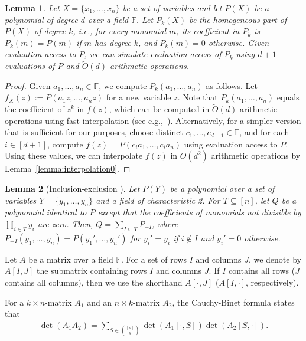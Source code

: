 \documentclass[10pt,a4paper]{article}
\newtheorem{lemma}{Lemma}[section]
\newcommand{\F}{\ensuremath{\mathbb F}\xspace}
\begin{document}
\begin{lemma} \label{lemma:interpolation}
  Let $X = \{ x_1, \dots, x_n \}$ be a set of variables and let $P(X)$ be a polynomial of degree $d$ over a field $\F$.
  Let $P_k(X)$ be the homogeneous part of $P(X)$ of degree $k$, i.e., for every monomial $m$, its coefficient in $P_k$ is $P_k(m) = P(m)$ if $m$ has degree $k$, and $P_k(m) = 0$ otherwise. 
  Given evaluation access to $P$, we can simulate evaluation access of $P_k$ using $d + 1$ evaluations of $P$ and $\tilde{O}(d)$ arithmetic operations.
\end{lemma}
\begin{proof}
  Given $a_1, \dots, a_n \in \F$, we compute $P_k(a_1, \dots, a_n)$ as follows.
  Let $f_X(z):=P(a_1 z, \ldots, a_n z)$ for a new variable $z$.
  Note that $P_k(a_1, \dots, a_n)$ equals the coefficient of $z^k$ in $f(z)$,
  which can be computed in $\tilde{O}(d)$ arithmetic operations using
  fast interpolation (see e.g.,~\cite{vzGathen-MCA}). Alternatively,
  for a simpler version that is sufficient for our purposes, 
  choose distinct $c_1, \dots, c_{d+1} \in \F$, and for each $i \in [d+1]$, compute $f(z) = P(c_i a_1, \dots, c_i a_n)$ using evaluation access to $P$.
  Using these values, we can interpolate $f(z)$ in $O(d^2)$ arithmetic operations by Lemma~\ref{lemma:interpolation0}.
\end{proof}

\begin{lemma}[Inclusion-exclusion \cite{Wahlstrom13STACS}]
  \label{lemma:inclusion-exclusion}
  Let $P(Y)$ be a polynomial over a set of variables $Y = \{ y_1, \dots, y_n \}$ and a field of characteristic 2.
  For $T \subseteq [n]$, let $Q$ be a polynomial identical to $P$ except that the coefficients of monomials not divisible by $\prod_{i \in T} y_i$ are zero.
  Then, $Q = \sum_{I \subseteq T} P_{-I}$, where $P_{-I}(y_1, \dots, y_n) = P(y_1', \dots, y_n')$ for $y_i' = y_i$ if $i \notin I$ and $y_i' = 0$ otherwise. 
\end{lemma}

Let $A$ be a matrix over a field $\F$.
For a set of rows $I$ and columns $J$, we denote by $A[I, J]$ the submatrix containing rows $I$ and columns $J$.
If $I$ contains all rows ($J$ contains all columns), then we use the shorthand $A[\cdot, J]$ ($A[I, \cdot]$, respectively).

For a $k \times n$-matrix $A_1$ and an $n \times k$-matrix $A_2$, the Cauchy-Binet formula states that
\begin{align*}
  \det (A_1 A_2) = \sum_{S \in \binom{[n]}{k}} \det (A_1[\cdot, S]) \det (A_2[S, \cdot]).
\end{align*}
\end{document}
